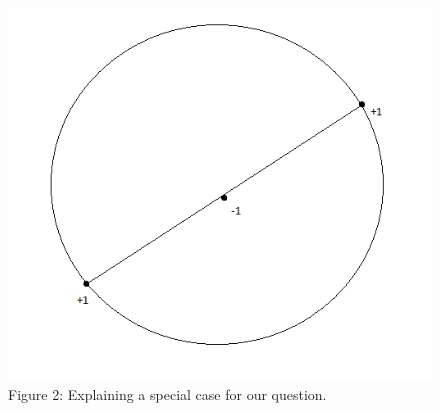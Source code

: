 \documentclass[11pt]{article}
\makeatletter
\def\maxwidth{\ifdim\Gin@nat@width>\linewidth\linewidth
    \else\Gin@nat@width\fi}
\let\Oldincludegraphics\includegraphics
\renewcommand{\includegraphics}[1]{\Oldincludegraphics[width=.8\maxwidth]{#1}}
\makeatother
\begin{document}
\begin{figure}
\centering
\includegraphics{Figure2.png}
\caption{Figure 2: Explaining a special case for our question.}
\end{figure}

    
    
    
    
\end{document}
